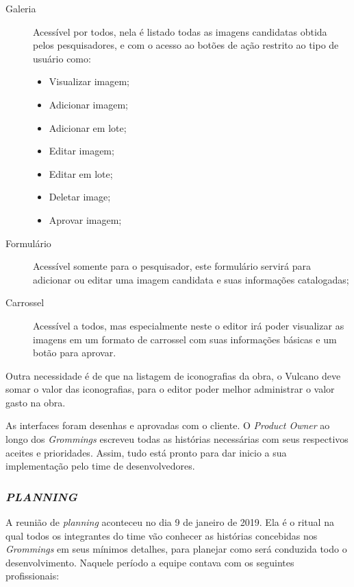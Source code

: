 \documentclass[
  12pt,            %
  openany,
  oneside,
  a4paper,         %
  english,      %
  brazil
]{article}
\numberwithin{figure}{section}
\numberwithin{table}{section}
\begin{document}
\begin{description}
  \item[Galeria] Acessível por todos, nela é listado todas as imagens candidatas obtida pelos pesquisadores, e com o acesso ao botões de ação restrito ao tipo de usuário como:

  \vspace{-10mm}
  \begin{singlespace}
    \begin{itemize}
      \item Visualizar imagem;
      \item Adicionar imagem;
      \item Adicionar em lote;
      \item Editar imagem;
      \item Editar em lote;
      \item Deletar image;
      \item Aprovar imagem;
    \end{itemize}
  \end{singlespace}
  \vspace{-5mm}

  \item[Formulário] Acessível somente para o pesquisador, este formulário servirá para adicionar ou editar uma imagem candidata e suas informações catalogadas;

  \item[Carrossel] Acessível a todos, mas especialmente neste o editor irá poder visualizar as imagens em um formato de carrossel com suas informações básicas e um botão para aprovar.
\end{description}

Outra necessidade é de que na listagem de iconografias da obra, o Vulcano deve somar o valor das iconografias, para o editor poder melhor administrar o valor gasto na obra.

As interfaces foram desenhas e aprovadas com o cliente. O \textit{Product Owner} ao longo dos \textit{Grommings} escreveu todas as histórias necessárias com seus respectivos aceites e prioridades. Assim, tudo está pronto para dar inicio a sua implementação pelo time de desenvolvedores.


\subsubsection{\textit{PLANNING}}

A reunião de \textit{planning} aconteceu no dia 9 de janeiro de 2019. Ela é o ritual na qual todos os integrantes do time vão conhecer as histórias concebidas nos \textit{Grommings} em seus mínimos detalhes, para planejar como será conduzida todo o desenvolvimento. Naquele período a equipe contava com os seguintes profissionais:
\end{document}
